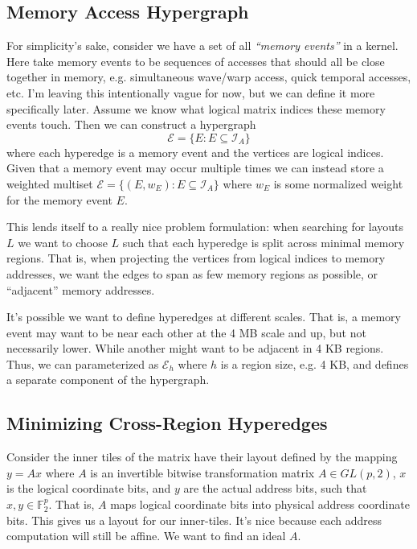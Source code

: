 \documentclass[10pt]{article}
\theoremstyle{remark}
\begin{document}
\subsection{Memory Access Hypergraph}

For simplicity's sake, consider we have a set of all {\it ``memory events''} in a kernel.
Here take memory events to be sequences of accesses that should all be close together in memory, e.g. simultaneous wave/warp access, quick temporal accesses, etc.
I'm leaving this intentionally vague for now, but we can define it more specifically later.
Assume we know what logical matrix indices these memory events touch.
Then we can construct a hypergraph
\[
\mathcal{E} = \{E : E \subseteq \mathcal{I}_A\}
\]
where each hyperedge is a memory event and the vertices are logical indices.
Given that a memory event may occur multiple times we can instead store a weighted multiset
\(
\mathcal{E}=\{(E,w_E) : E \subseteq \mathcal{I}_A\}
\)
where $w_E$ is some normalized weight for the memory event $E$.

This lends itself to a really nice problem formulation: when searching for layouts $L$ we want to choose $L$ such that each hyperedge is split across minimal memory regions. That is, when projecting the vertices from logical indices to memory addresses, we want the edges to span as few memory regions as possible, or ``adjacent'' memory addresses.

It's possible we want to define hyperedges at different scales. That is, a memory event may want to be near each other at the 4 MB scale and up, but not necessarily lower. While another might want to be adjacent in 4 KB regions. Thus, we can parameterized as $\mathcal{E}_h$ where $h$ is a region size, e.g. 4 KB, and defines a separate component of the hypergraph.


\subsection{Minimizing Cross-Region Hyperedges}

Consider the inner tiles of the matrix have their layout defined by the mapping $y=Ax$ where $A$ is an invertible bitwise transformation matrix $A\in GL(p,2)$, $x$ is the logical coordinate bits, and $y$ are the actual address bits, such that $x,y \in \mathbb{F}_2^p$.
That is, $A$ maps logical coordinate bits into physical address coordinate bits.
This gives us a layout for our inner-tiles.
It's nice because each address computation will still be affine.
We want to find an ideal $A$.
\end{document}
